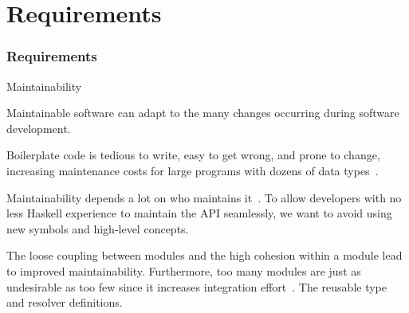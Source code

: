\section{Requirements}

\begin{frame}\frametitle{Requirements}  

\begin{alertblock}{Maintainability}

Maintainable software can adapt to the many changes occurring during software development.~\cite{requirements-change-1,view-of-web, sof-sus-institute-maintainability}


\begin{itemize}

     Boilerplate code is tedious to write, easy to get wrong, and prone to change, increasing maintenance costs for large programs with dozens of data types~\cite{scrap-your-boilerplate}.

     Maintainability depends a lot on who maintains it~\cite{contr-reduce-maintainability}. To allow developers with no less Haskell experience to maintain the API seamlessly, we want to avoid using new symbols and high-level concepts.

    The loose coupling between modules and the high cohesion within a module lead to improved maintainability.  Furthermore, too many modules are just as undesirable as too few since it increases integration effort~\cite{arc-modularity}.
    The reusable type and resolver definitions. 
    
\end{itemize}
\end{alertblock}
\end{frame}

